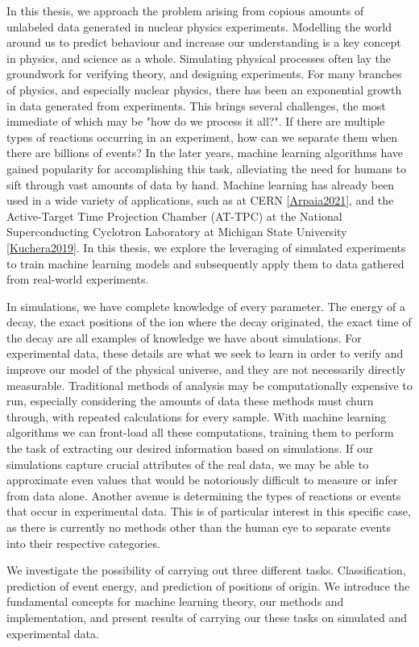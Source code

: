 \noindent In this thesis, we approach the problem arising from copious amounts of unlabeled data
generated in nuclear physics experiments. Modelling the world around us to predict behaviour and increase 
our understanding is a key concept in physics, and science as a whole. Simulating physical processes often 
lay the groundwork for verifying theory, and designing experiments. For many branches of physics, 
and especially nuclear physics, there has been an exponential growth in data generated from experiments. 
This brings several challenges, the most immediate of which may be "how do we process it all?". If there are 
multiple types of
reactions occurring in an experiment, how can we separate them when there are billions of events?
In the later years, machine learning algorithms have gained popularity for accomplishing this task,
alleviating the need for humans to sift through vast amounts of data by hand. 
Machine learning has already been used in a wide variety of applications, such as at CERN \ref{Arpaia2021},
and the Active-Target Time Projection Chamber (AT-TPC) at the National Superconducting Cyclotron Laboratory
at Michigan State University \ref{Kuchera2019}. In this thesis, we explore the leveraging of simulated experiments to train machine learning models and subsequently
apply them to data gathered from real-world experiments.


\noindent In simulations, we have complete knowledge of every parameter. The energy of a decay, the exact positions
of the ion where the decay originated, the exact time of the decay are all examples of knowledge we have about
simulations. For experimental data, these details are what we seek to learn in order to verify and improve our
model of the physical universe, and they are not necessarily directly measurable.
Traditional methods of analysis may be computationally expensive to run, especially considering the
amounts of data these methods must churn through, with repeated calculations for every sample.
With machine learning algorithms we can front-load all these computations, training them to perform
the task of extracting our desired information based on simulations. If our simulations capture crucial
attributes of the real data, we may be able to approximate even values that would be notoriously difficult 
to measure or infer from data alone. Another avenue is determining the types of reactions or events that
occur in experimental data. This is of particular interest in this specific case, as there is currently no methods
other than the human eye to separate events into their respective categories. 

\noindent We investigate the possibility of carrying out three different tasks. Classification, prediction of event energy, and prediction of
positions of origin. We introduce the fundamental concepts for machine learning theory, our methods and
implementation, and present results of carrying our these tasks on simulated and experimental data.